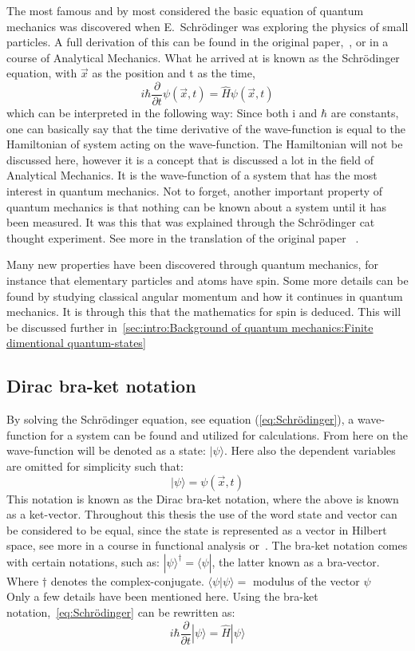 The most famous and by most considered the basic equation of quantum mechanics was discovered when E.\ Schrödinger was exploring the physics of small particles. A full derivation of this can be found in the original paper,~\cite{Schrodinger:1926}, or in a course of Analytical Mechanics. What he arrived at is known as the Schrödinger equation, with $\vec{x}$ as the position and t as the time, 
\begin{equation} \label{eq:Schrödinger}
i\hbar\frac{\partial}{\partial t}\psi (\vec{x}, t) = \hat{H}\psi (\vec{x}, t)
\end{equation}
which can be interpreted in the following way:
Since both i and $\hbar$ are constants, one can basically say that the time derivative of the wave-function is equal to the Hamiltonian of system acting on the wave-function. The Hamiltonian will not be discussed here, however it is a concept that is discussed a lot in the field of Analytical Mechanics.
It is the wave-function of a system that has the most interest in quantum mechanics. 
Not to forget, another important property of quantum mechanics is that nothing can be known about a system until it has been measured. It was this that was explained through the Schrödinger cat thought experiment. See more in the translation of the original paper ~\cite{Schrodinger:1980}.

Many new properties have been discovered through quantum mechanics, for instance that elementary particles and atoms have spin. Some more details can be found by studying classical angular momentum and how it continues in quantum mechanics. It is through this that the mathematics for spin is deduced. This will be discussed further in~\ref{sec:intro:Background of quantum mechanics:Finite dimentional quantum-states}
\subsection{Dirac bra-ket notation}\label{subsec:Dirac bra-ket notation}
By solving the Schrödinger equation, see equation (\ref{eq:Schrödinger}), a wave-function for a system can be found and utilized for calculations. From here on the wave-function will be denoted as a state: $|\psi\rangle$.
Here also the dependent variables are omitted for simplicity such that:
$$|\psi\rangle = \psi (\vec{x}, t)$$
This notation is known as the Dirac bra-ket notation, where the above is known as a ket-vector. Throughout this thesis the use of the word state and vector can be considered to be equal, since the state is represented as a vector in Hilbert space, see more in a course in functional analysis or~\cite{Kreyzig}. The bra-ket notation comes with certain notations, such as: $|\psi\rangle^\dagger = \langle\psi|$, the latter known as a bra-vector. Where $\dagger$ denotes the complex-conjugate. $\langle\psi|\psi\rangle =$ modulus of the vector $\psi$\\
Only a few details have been mentioned here. Using the bra-ket notation,~\ref{eq:Schrödinger} can be rewritten as: \begin{equation} \label{eq:Schrödinger2}
i\hbar\frac{\partial}{\partial t}|\psi\rangle = \hat{H}|\psi\rangle
\end{equation}
